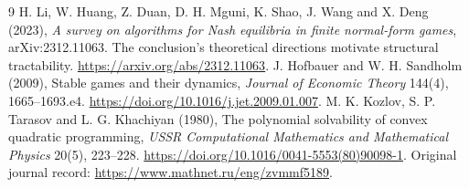 \documentclass[11pt]{article}
\theoremstyle{remark}\newtheorem{remark}[theorem]{Remark}
\begin{document}
\begin{thebibliography}{9}
 H. Li, W. Huang, Z. Duan, D. H. Mguni, K. Shao, J. Wang and X. Deng (2023), \emph{A survey on algorithms for Nash equilibria in finite normal-form games}, arXiv:2312.11063. The conclusion's theoretical directions motivate structural tractability. \url{https://arxiv.org/abs/2312.11063}.
 J. Hofbauer and W. H. Sandholm (2009), Stable games and their dynamics, \emph{Journal of Economic Theory} 144(4), 1665--1693.e4. \url{https://doi.org/10.1016/j.jet.2009.01.007}.
 M. K. Kozlov, S. P. Tarasov and L. G. Khachiyan (1980), The polynomial solvability of convex quadratic programming, \emph{USSR Computational Mathematics and Mathematical Physics} 20(5), 223--228. \url{https://doi.org/10.1016/0041-5553(80)90098-1}. Original journal record: \url{https://www.mathnet.ru/eng/zvmmf5189}.
\end{thebibliography}
\end{document}
